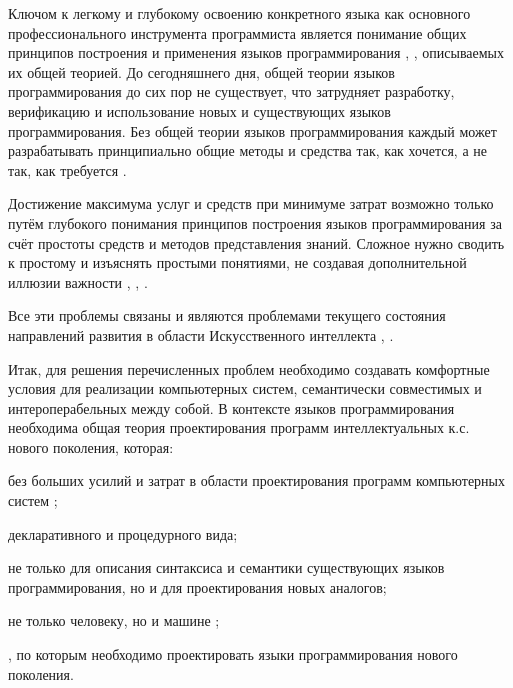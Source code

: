 \begin{textitemize}
    \item Ключом к легкому и глубокому освоению конкретного языка как основного профессионального инструмента программиста является понимание общих принципов построения и применения языков программирования \cite{Turner2007}, \cite{Constanta2022}, описываемых их общей теорией. До сегодняшнего дня, общей теории языков программирования до сих пор не существует, что затрудняет разработку, верификацию и использование новых и существующих языков программирования. Без общей теории языков программирования каждый может разрабатывать принципиально общие методы и средства так, как хочется, а не так, как требуется .
    \item Достижение максимума услуг и средств при минимуме затрат возможно только путём глубокого понимания принципов построения языков программирования за счёт простоты средств и методов представления знаний. Сложное нужно сводить к простому и изъяснять простыми понятиями, не создавая дополнительной иллюзии важности \cite{Sellitto2022}, \cite{Chaparro2014}, \cite{Posnett2011}.
\end{textitemize}

Все эти проблемы связаны и являются проблемами текущего состояния направлений развития в области Искусственного интеллекта \cite{Skeeter2020}, \cite{Constanta2022}.

Итак, для решения перечисленных проблем необходимо создавать комфортные условия для реализации компьютерных систем, семантически совместимых и интероперабельных между собой. В контексте языков программирования необходима общая теория проектирования программ интеллектуальных к.с. нового поколения, которая:
\begin{textitemize}
    \item {} без больших усилий и затрат  в области проектирования программ компьютерных систем ;
    \item {} декларативного и процедурного вида;
    \item {} не только для описания синтаксиса и семантики существующих языков программирования, но и для проектирования новых аналогов;
    \item {} не только человеку, но и машине ;
    \item {}, по которым необходимо проектировать языки программирования нового поколения.
\end{textitemize}

